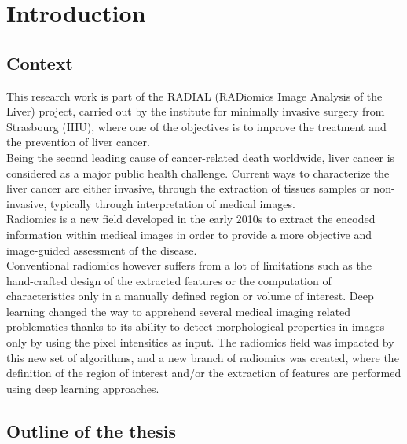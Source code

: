 \chapter*{Introduction}
\label{cha:Introduction}

\section*{Context}
\label{sec:Context}

This research work is part of the RADIAL (RADiomics Image Analysis of the Liver) project, carried out by the
institute for minimally invasive surgery from Strasbourg (IHU), where
one of the objectives is to improve the treatment and the prevention of
liver cancer.\\
Being the second leading cause of cancer-related death worldwide, liver
cancer is considered as a major public health challenge. Current ways to characterize the liver cancer are either invasive, 
through the extraction of tissues samples or non-invasive, typically 
through interpretation of medical images.\\
Radiomics is a new field developed in the early 2010s to extract the encoded information within medical images in order to provide a more objective and image-guided assessment of the disease.\\
Conventional radiomics however suffers from a lot of limitations such as the hand-crafted design of the extracted features or the computation of characteristics only in a manually defined region or volume of interest. Deep learning changed the way to apprehend several medical imaging related problematics thanks to its ability to detect
morphological properties in images only by using the pixel intensities
as input. The radiomics field was impacted by this new set of algorithms, and a new branch of radiomics was created, where the definition of the region of interest and/or the extraction of features are performed using deep learning approaches.

\section*{Outline of the thesis}
\label{sec:Outline}

